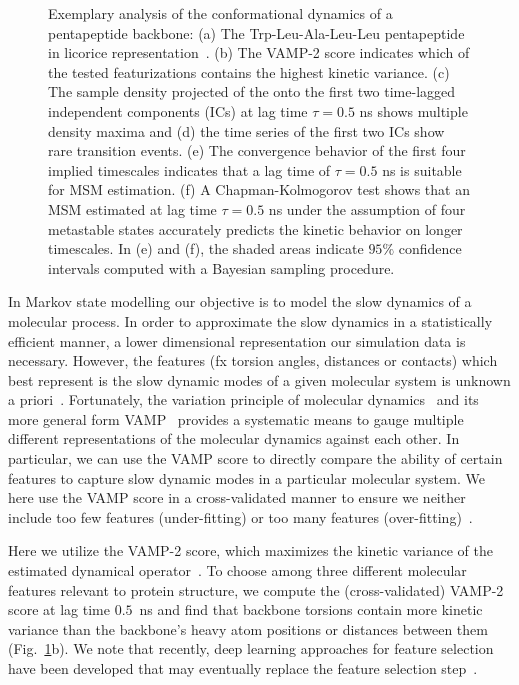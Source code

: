 \documentclass[9pt,tutorial]{livecoms}
\begin{document}
\begin{figure}
\caption{Exemplary analysis of the conformational dynamics of a pentapeptide backbone: (a) The Trp-Leu-Ala-Leu-Leu pentapeptide in licorice representation~\cite{vmd}.
(b) The VAMP-2 score indicates which of the tested featurizations contains the highest kinetic variance.
(c) The  sample density projected of the onto the first two time-lagged independent components (ICs) at lag time $\tau=0.5$ ns shows multiple density maxima and
(d) the time series of the first two ICs show rare transition events.
(e) The convergence behavior of the first four implied timescales indicates that a lag time of $\tau=0.5$ ns is suitable for MSM estimation.
(f) A Chapman-Kolmogorov test shows that an MSM estimated at lag time $\tau=0.5$ ns under the assumption of four metastable states accurately predicts the kinetic behavior on longer timescales.
In (e) and (f), the shaded areas indicate $95\%$ confidence intervals computed with a Bayesian sampling procedure.}
\label{fig:io-to-ck}
\end{figure}

In Markov state modelling our objective is to model the slow dynamics of a molecular process. In order to approximate the slow dynamics in a statistically efficient manner, a lower dimensional representation our simulation data is necessary. However, the features (fx torsion angles, distances or contacts) which best represent is the slow dynamic modes of a given molecular system is unknown a priori~\cite{NoeClementiReview}. Fortunately, the variation principle of molecular dynamics~\cite{noe-vac,nueske-vamk} and its more general form VAMP~\cite{vamp-preprint} provides a systematic means to gauge multiple different representations of the molecular dynamics against each other. In particular, we can use the VAMP score to directly compare the ability of certain features to capture slow dynamic modes in a particular molecular system. We here use the VAMP score in a cross-validated manner to ensure we neither include too few features (under-fitting) or too many features (over-fitting)~\cite{gmrq}.

Here we utilize the VAMP-2 score, which maximizes the kinetic variance of the estimated dynamical operator~\cite{kinetic-maps}.
To choose among three different molecular features relevant to protein structure, we compute the (cross-validated) VAMP-2 score at lag time $0.5$~ns and find that backbone torsions contain more kinetic variance than the backbone's heavy atom positions or distances between them (Fig.~\ref{fig:io-to-ck}b).
We note that recently, deep learning approaches for feature selection have been developed that may eventually replace the feature selection step~\cite{vampnet,tae,hernandez-vde}.
\end{document}
